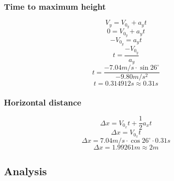 \documentclass[11pt, letterpaper, includehead]{article}
\begin{document}
\subsubsection{Time to maximum height} %
$$V_y = V_{0_y} + a_yt$$
$$0 = V_{0_y} + a_yt$$
$$-V_{0_y} = a_yt$$
$$t = \frac{-V_{0_y}}{a_y}$$
$$t = \frac{-7.04m/s\cdot\sin26^{\circ}}{-9.80m/s^2}$$
$$t = 0.314912s \approx 0.31s$$
\subsubsection{Horizontal distance} %
$$\Delta x = V_{0_x}t + \frac{1}{2}a_xt$$
$$\Delta x = V_{0_x}t$$
$$\Delta x = 7.04m/s\cdot \cos26^{\circ}\cdot 0.31s$$
$$\Delta x = 1.99261m \approx 2m$$
\subsection{Analysis}  %
\end{document}
